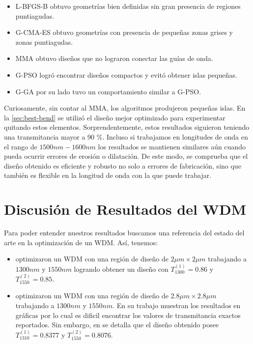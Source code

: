\begin{itemize}
  \item L-BFGS-B obtuvo geometrías bien definidas sin gran presencia de regiones puntiagudas.

  \item G-CMA-ES obtuvo geometrías con presencia de pequeñas zonas grises y zonas puntiagudas.

  \item MMA obtuvo diseños que no lograron conectar las guías de onda.

  \item G-PSO logró encontrar diseños compactos y evitó obtener islas pequeñas.

  \item G-GA por su lado tuvo un comportamiento similar a G-PSO.

\end{itemize}

Curiosamente, sin contar al MMA, los algoritmos produjeron pequeñas islas.
En la \autoref{sec:best-bend} se utilizó el diseño mejor optimizado para experimentar
quitando estos elementos. Sorprendentemente, estos resultados siguieron teniendo una transmitancia
mayor a 90 \%.
Incluso si trabajamos en longitudes de onda en el rango de $1500nm-1600nm$
los resultados se mantienen similares aún cuando pueda ocurrir errores de erosión o dilatación.
De este modo, se comprueba que el diseño obtenido es eficiente y robusto no solo a errores
de fabricación, sino que también es flexible en la longitud de onda con la que puede trabajar.

\section{Discusión de Resultados del WDM}

Para poder entender nuestros resultados buscamos una referencia del estado del arte en la optimización
de un WDM. Así, tenemos:

\begin{itemize}
  \item \cite{Christiansen2021} optimizaron un WDM con una región
  de diseño de $2 \mu m \times 2 \mu m$ trabajando a $1300 nm$ y $1550 nm$ logrando obtener un diseño
  con $T_{1300}^{(1)} = 0.86$ y $T_{1550}^{(2)} = 0.85$.

  \item \cite{Piggott2015} optimizaron un WDM con una región de diseño de $2.8 \mu m \times 2.8 \mu m$
    trabajando a $1300 nm$ y $1550 nm$. En su trabajo muestran los resultados en gráficas por lo cual
    es dificil encontrar los valores de transmitancia exactos reportados. Sin embargo, en
    \cite{Sigmund2016} se detalla que el diseño obtenido posee 
    $T_{1310}^{(1)} = 0.8377$ y $T_{1550}^{(2)} = 0.8076$.
\end{itemize}

